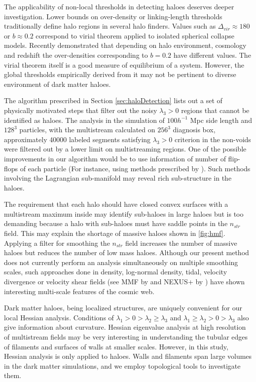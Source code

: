 The applicability of non-local thresholds in detecting haloes deserves deeper investigation. Lower bounds on over-density or linking-length thresholds traditionally define halo regions in several halo finders. Values such as $\Delta_{vir} \approx 180$ or $b \approx 0.2$ correspond to virial theorem applied to isolated spherical collapse models. Recently \cite{More2011} demonstrated that depending on halo environment, cosmology and redshift the over-densities corresponding to $b = 0.2$ have different values. The virial theorem itself is a good measure of equilibrium of a system. However, the global thresholds empirically derived from it may not be pertinent to diverse environment of dark matter haloes. 


The algorithm prescribed in Section \ref{sec:haloDetection} lists out a set of physically motivated steps that filter out the noisy $\lambda_3 > 0$ regions that cannot be identified as haloes. The analysis in the simulation of $100 h^{-1}$ Mpc side length and $128^3$ particles, with the multistream calculated on $256^3$ diagnosis box, approximately 40000 labeled segments satisfying $\lambda_3 > 0$ criterion in the non-voids were filtered out by a lower limit on multistreaming regions. One of the possible improvements in our algorithm would be to use information of number of flip-flops of each particle (For instance, using methods prescribed by \citealt{Shandarin2014a,Shandarin2016}). Such methods involving the Lagrangian sub-manifold may reveal rich sub-structure in the haloes. 

 
The requirement that each halo should have closed convex surfaces with a multistream maximum inside may identify sub-haloes in large haloes but is too demanding because a halo with sub-haloes must have saddle points in the $n_{str}$ field. This may explain the shortage of massive haloes shown in \autoref{fig:hmf}. Applying a filter for smoothing the $n_{str}$ field increases the number of massive haloes but reduces the number of low mass haloes. Although our present method does not currently perform an analysis simultaneously on multiple smoothing scales, such approaches done in density, log-normal density, tidal, velocity divergence or velocity shear fields (see MMF by \citealt{Aragon-Calvo2007} and NEXUS+ by \citealt{Cautun2013}) have shown interesting multi-scale features of the cosmic web. 


Dark matter haloes, being localized structures, are uniquely convenient for our local Hessian analysis. Conditions of $\lambda_1 > 0 > \lambda_2 \geq \lambda_3 $ and $\lambda_1 \geq \lambda_2 > 0 > \lambda_3 $ also give information about curvature. Hessian eigenvalue analysis at high resolution of multistream fields may be very interesting in understanding the tubular edges of filaments and surfaces of walls at smaller scales. However, in this study, Hessian analysis is only applied to haloes. Walls and filaments span large volumes in the dark matter simulations, and we employ topological tools to investigate them. 


